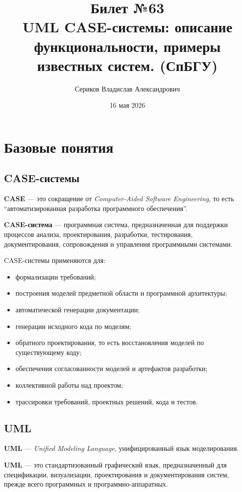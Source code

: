 \documentclass[12pt,a4paper]{article}
\title{Билет №63 \\ \small UML CASE-системы: описание функциональности, примеры известных систем. (СпБГУ)}
\author{Сериков Владислав Александрович}
\date{16 мая 2026}
\begin{document}
\maketitle
\tableofcontents
\newpage

\section{Базовые понятия}

\subsection{CASE-системы}

\textbf{CASE} --- это сокращение от \textit{Computer-Aided Software Engineering}, то есть ``автоматизированная разработка программного обеспечения''.

\textbf{CASE-система} --- программная система, предназначенная для поддержки процессов анализа, проектирования, разработки, тестирования, документирования, сопровождения и управления программными системами.

CASE-системы применяются для:
\begin{itemize}
    \item формализации требований;
    \item построения моделей предметной области и программной архитектуры;
    \item автоматической генерации документации;
    \item генерации исходного кода по моделям;
    \item обратного проектирования, то есть восстановления моделей по существующему коду;
    \item обеспечения согласованности моделей и артефактов разработки;
    \item коллективной работы над проектом;
    \item трассировки требований, проектных решений, кода и тестов.
\end{itemize}

\subsection{UML}

\textbf{UML} --- \textit{Unified Modeling Language}, унифицированный язык моделирования.

\textbf{UML} --- это стандартизованный графический язык, предназначенный для спецификации, визуализации, проектирования и документирования систем, прежде всего программных и программно-аппаратных.
\end{document}
